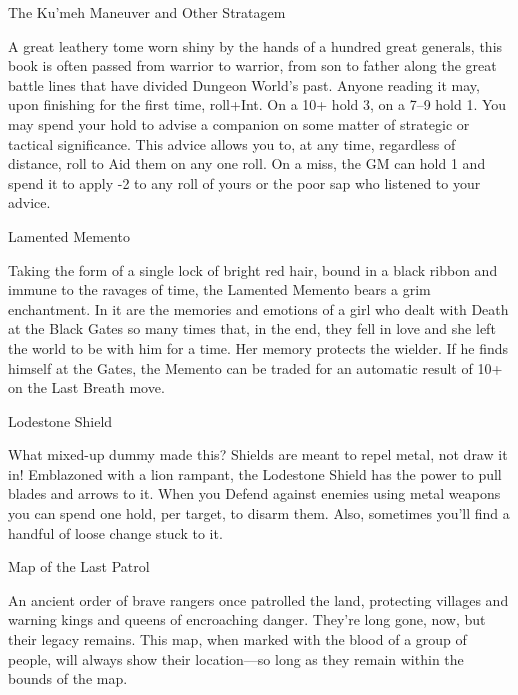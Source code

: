  

The Ku’meh Maneuver and Other Stratagem	 

 

A great leathery tome worn shiny by the hands of a hundred great generals, this book is often passed from warrior to warrior, from son to father along the great battle lines that have divided Dungeon World’s past. Anyone reading it may, upon finishing for the first time, roll+Int. On a 10+ hold 3, on a 7–9 hold 1. You may spend your hold to advise a companion on some matter of strategic or tactical significance. This advice allows you to, at any time, regardless of distance, roll to Aid them on any one roll. On a miss, the GM can hold 1 and spend it to apply -2 to any roll of yours or the poor sap who listened to your advice.

 

Lamented Memento	 

 

Taking the form of a single lock of bright red hair, bound in a black ribbon and immune to the ravages of time, the Lamented Memento bears a grim enchantment. In it are the memories and emotions of a girl who dealt with Death at the Black Gates so many times that, in the end, they fell in love and she left the world to be with him for a time. Her memory protects the wielder. If he finds himself at the Gates, the Memento can be traded for an automatic result of 10+ on the Last Breath move.

 

Lodestone Shield	 

 

What mixed-up dummy made this? Shields are meant to repel metal, not draw it in! Emblazoned with a lion rampant, the Lodestone Shield has the power to pull blades and arrows to it. When you Defend against enemies using metal weapons you can spend one hold, per target, to disarm them. Also, sometimes you’ll find a handful of loose change stuck to it.

 

Map of the Last Patrol	 

 

An ancient order of brave rangers once patrolled the land, protecting villages and warning kings and queens of encroaching danger. They’re long gone, now, but their legacy remains. This map, when marked with the blood of a group of people, will always show their location—so long as they remain within the bounds of the map. 

